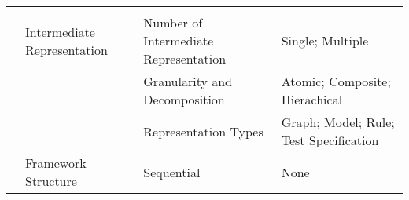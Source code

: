 \begin{table}[]
{\begin{tabular}{clll}
\multicolumn{1}{l|}{}                      &                                                      &                                         &                                                                                                                                                                                                                                                                                                                                           \\ \cline{2-4} 
\multicolumn{1}{l|}{}                      & Intermediate Representation                          & Number of Intermediate Representation   & Single; Multiple                                                                                                                                                                                                                                                                                                                          \\
\multicolumn{1}{l|}{}                      &                                                      & Granularity and Decomposition           & Atomic; Composite; Hierachical                                                                                                                                                                                                                                                                                                            \\
\multicolumn{1}{l|}{}                      &                                                      & Representation Types                    & Graph; Model; Rule; Test Specification                                                                                                                                                                                                                                                                                                    \\ \cline{2-4} 
\multicolumn{1}{l|}{}                      & \multirow{4}{*}{Framework Structure}                 & Sequential                              & None                                                                                                                                                                                                                                                                                                                                      \\

\end{tabular}}
\end{table}
